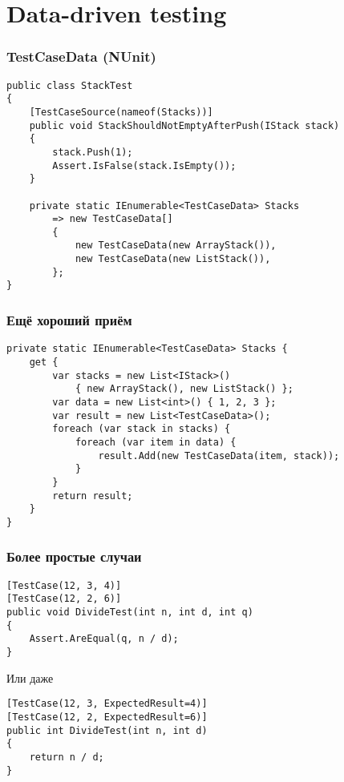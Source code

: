 \documentclass{../../slides-style}
\begin{document}
    
    \begin{frame}[plain]
        \titlepage
    \end{frame}

    \section{Data-driven testing}

    \begin{frame}[fragile]
        \frametitle{TestCaseData (NUnit)}
        \begin{verbatim}
public class StackTest
{
    [TestCaseSource(nameof(Stacks))]
    public void StackShouldNotEmptyAfterPush(IStack stack)
    {
        stack.Push(1);
        Assert.IsFalse(stack.IsEmpty());
    }

    private static IEnumerable<TestCaseData> Stacks
        => new TestCaseData[]
        {
            new TestCaseData(new ArrayStack()),
            new TestCaseData(new ListStack()),
        };
}
        \end{verbatim}
    \end{frame}

    \begin{frame}[fragile]
        \frametitle{Ещё хороший приём}
        \begin{verbatim}
private static IEnumerable<TestCaseData> Stacks { 
    get {
        var stacks = new List<IStack>() 
            { new ArrayStack(), new ListStack() };
        var data = new List<int>() { 1, 2, 3 };
        var result = new List<TestCaseData>();
        foreach (var stack in stacks) {
            foreach (var item in data) {
                result.Add(new TestCaseData(item, stack));
            }
        }
        return result;
    }
}
        \end{verbatim}
    \end{frame}

    \begin{frame}[fragile]
        \frametitle{Более простые случаи}
        \begin{verbatim}
[TestCase(12, 3, 4)]
[TestCase(12, 2, 6)]
public void DivideTest(int n, int d, int q)
{
    Assert.AreEqual(q, n / d);
}
        \end{verbatim}
        \vspace{3mm}
        Или даже
        \begin{verbatim}
[TestCase(12, 3, ExpectedResult=4)]
[TestCase(12, 2, ExpectedResult=6)]
public int DivideTest(int n, int d)
{
    return n / d;
}
        \end{verbatim}
    \end{frame}
\end{document}
